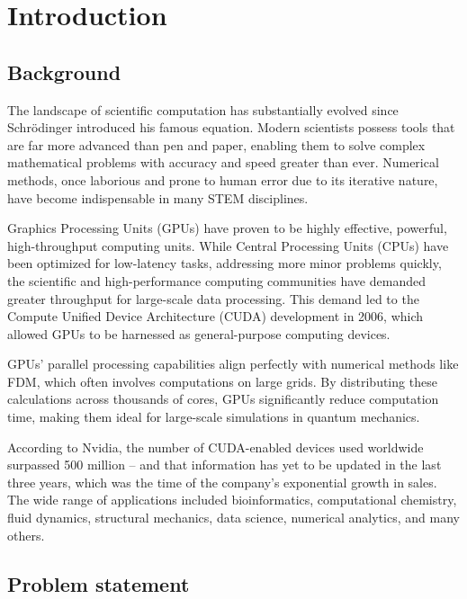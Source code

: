 \section{Introduction}

\subsection{Background}

The landscape of scientific computation has substantially evolved since Schrödinger introduced his famous equation. Modern scientists possess tools that are far more advanced than pen and paper, enabling them to solve complex mathematical problems with accuracy and speed greater than ever. Numerical methods, once laborious and prone to human error due to its iterative nature, have become indispensable in many STEM disciplines.

Graphics Processing Units (GPUs) have proven to be highly effective, powerful, high-throughput computing units. While Central Processing Units (CPUs) have been optimized for low-latency tasks, addressing more minor problems quickly, the scientific and high-performance computing communities have demanded greater throughput for large-scale data processing. This demand led to the Compute Unified Device Architecture (CUDA) development in 2006, which allowed GPUs to be harnessed as general-purpose computing devices.

GPUs' parallel processing capabilities align perfectly with numerical methods like FDM, which often involves computations on large grids. By distributing these calculations across thousands of cores, GPUs significantly reduce computation time, making them ideal for large-scale simulations in quantum mechanics.

According to Nvidia, the number of CUDA-enabled devices used worldwide surpassed 500 million -- and that information has yet to be updated in the last three years, which was the time of the company's exponential growth in sales. The wide range of applications included bioinformatics, computational chemistry, fluid dynamics, structural mechanics, data science, numerical analytics, and many others.\cite{cuda} 	

\subsection{Problem statement}

